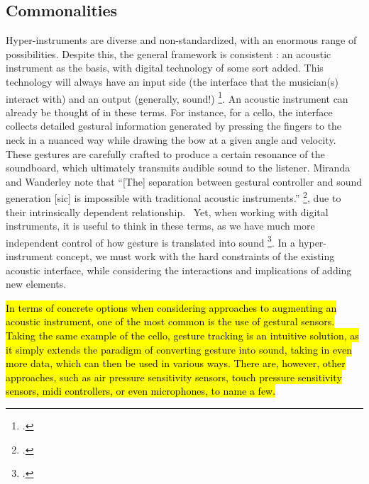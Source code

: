 \documentclass[12pt,twoside,maitrise]{dms_ks}
\theoremstyle{definition}
\begin{document}
{\subsection{Commonalities}

Hyper-instruments are diverse and non-standardized, with an enormous range of possibilities.  
Despite this, the general framework is consistent : an acoustic instrument as the basis, with digital technology of some sort added. 
This technology will always have an input side (the interface that the musician(s) interact with) and an output (generally, sound!) \footcite[3]{miranda_new_2006}. 
An acoustic instrument can already be thought of in these terms.
For instance, for a cello, the interface collects detailed gestural information generated by pressing the fingers to the neck in a nuanced way while drawing the bow at a given angle and velocity. 
These gestures are carefully crafted to produce a certain resonance of the soundboard, which ultimately transmits audible sound to the listener. 
Miranda and Wanderley note that “[The] separation between gestural controller and sound generation [sic] is impossible with traditional acoustic instruments.” \footcite[3]{miranda_new_2006}, due to their intrinsically dependent relationship.~
Yet, when working with digital instruments, it is useful to think in these terms, as we have much more independent control of how gesture is translated into sound \footcite[24--25]{jorda_digital_2005}.
In a hyper-instrument concept, we must work with the hard constraints of the existing acoustic interface, while considering the interactions and implications of adding new elements. 

\hl{In terms of concrete options when considering approaches to augmenting an acoustic instrument, one of the most common is the use of gestural sensors. 
Taking the same example of the cello, gesture tracking is an intuitive solution, as it simply extends the paradigm of converting gesture into sound, taking in even more data, which can then be used in various ways. 
There are, however, other approaches, such as air pressure sensitivity sensors, touch pressure sensitivity sensors, midi controllers, or even microphones, to name a few.} 

}
\end{document}
